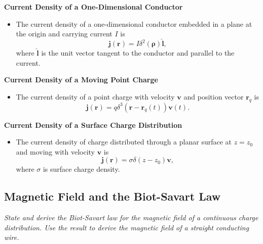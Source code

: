 \documentclass[11pt, a4paper]{article}
\renewcommand{\vec}[1]{\bm{#1}} %
\newcommand{\uvec}[1]{\hat{\vec{#1}}} %
\renewcommand{\r}{\vec{r}}
\renewcommand{\j}{\vec{j}}  %
\begin{document}
\textbf{Current Density of a One-Dimensional Conductor}
\begin{itemize}
	\item The current density of a one-dimensional conductor embedded in a plane at the origin and carrying current $ I $ is
	\begin{equation*}
		\j(\r) = I \delta^{2}(\vec{\rho}) \uvec{l},
	\end{equation*}
	where $ \uvec{l} $ is the unit vector tangent to the conductor and parallel to the current.
\end{itemize}

\textbf{Current Density of a Moving Point Charge}
\begin{itemize}
	\item The current density of a point charge with velocity $ \vec{v} $ and position vector $ \r_{q} $ is
	\begin{equation*}
		\j(\r) = q \delta^{3}(\r - \r_{q}(t))\vec{v}(t).
	\end{equation*}
\end{itemize}
	
\textbf{Current Density of a Surface Charge Distribution}
\begin{itemize}
    \item The current density of charge distributed through a planar surface at $ z = z_{0} $ and moving with velocity $ \vec{v} $ is
	\begin{equation*}
		\j(\r) = \sigma \delta (z - z_{0})\vec{v},
	\end{equation*}
	where $ \sigma $ is surface charge density. 
	
\end{itemize}

\subsection{Magnetic Field and the Biot-Savart Law}
\textit{State and derive the Biot-Savart law for the magnetic field of a continuous charge distribution. Use the result to derive the magnetic field of a straight conducting wire.}
\end{document}
